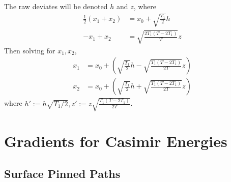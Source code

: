 The raw deviates will be denoted $h$ and $z$, where 
\begin{align}
  \frac{1}{2}(x_1+x_2) &= x_0 + \sqrt{\frac{T_1}{2}}h\\
  -x_1+x_2 &= \sqrt{\frac{2T_1(T-2T_1)}{T}}z
\end{align}
Then solving for $x_1, x_2$, 
\begin{align}
  x_1 & = x_0 + \left(\sqrt{\frac{T_1}{2}}h-\sqrt{\frac{T_1(T-2T_1)}{2T}}z\right)\\
  x_2 & = x_0 + \left(\sqrt{\frac{T_1}{2}}h+\sqrt{\frac{T_1(T-2T_1)}{2T}}z\right)
\end{align}
where $h' := h\sqrt{T_1/2}, z' := z\sqrt{\frac{T_1(T-2T_1)}{2T}}$.


\section{Gradients for Casimir Energies}
\subsection{Surface Pinned Paths}
\label{sec:path-pinning}

